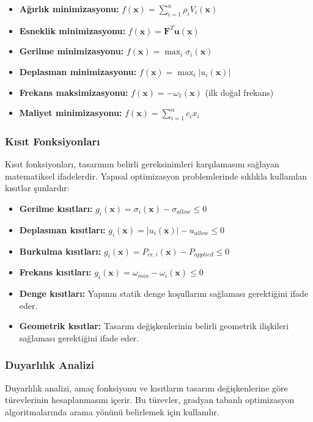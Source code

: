 \begin{itemize}
    \item \textbf{Ağırlık minimizasyonu:} $f(\mathbf{x}) = \sum_{i=1}^{n} \rho_i V_i(\mathbf{x})$
    \item \textbf{Esneklik minimizasyonu:} $f(\mathbf{x}) = \mathbf{F}^T \mathbf{u}(\mathbf{x})$
    \item \textbf{Gerilme minimizasyonu:} $f(\mathbf{x}) = \max_{i} \sigma_i(\mathbf{x})$
    \item \textbf{Deplasman minimizasyonu:} $f(\mathbf{x}) = \max_{i} |u_i(\mathbf{x})|$
    \item \textbf{Frekans maksimizasyonu:} $f(\mathbf{x}) = -\omega_1(\mathbf{x})$ (ilk doğal frekans)
    \item \textbf{Maliyet minimizasyonu:} $f(\mathbf{x}) = \sum_{i=1}^{n} c_i x_i$
\end{itemize}

\subsubsection{Kısıt Fonksiyonları}
Kısıt fonksiyonları, tasarımın belirli gereksinimleri karşılamasını sağlayan matematiksel ifadelerdir. Yapısal optimizasyon problemlerinde sıklıkla kullanılan kısıtlar şunlardır:

\begin{itemize}
    \item \textbf{Gerilme kısıtları:} $g_i(\mathbf{x}) = \sigma_i(\mathbf{x}) - \sigma_{allow} \leq 0$
    \item \textbf{Deplasman kısıtları:} $g_i(\mathbf{x}) = |u_i(\mathbf{x})| - u_{allow} \leq 0$
    \item \textbf{Burkulma kısıtları:} $g_i(\mathbf{x}) = P_{cr,i}(\mathbf{x}) - P_{applied} \leq 0$
    \item \textbf{Frekans kısıtları:} $g_i(\mathbf{x}) = \omega_{min} - \omega_i(\mathbf{x}) \leq 0$
    \item \textbf{Denge kısıtları:} Yapının statik denge koşullarını sağlaması gerektiğini ifade eder.
    \item \textbf{Geometrik kısıtlar:} Tasarım değişkenlerinin belirli geometrik ilişkileri sağlaması gerektiğini ifade eder.
\end{itemize}

\subsubsection{Duyarlılık Analizi}
Duyarlılık analizi, amaç fonksiyonu ve kısıtların tasarım değişkenlerine göre türevlerinin hesaplanmasını içerir. Bu türevler, gradyan tabanlı optimizasyon algoritmalarında arama yönünü belirlemek için kullanılır.

